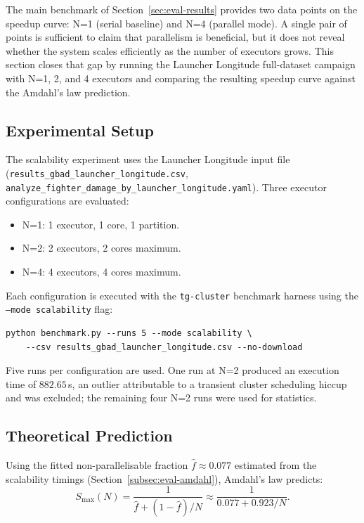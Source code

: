 The main benchmark of Section~\ref{sec:eval-results} provides two data points on
the speedup curve: N=1 (serial baseline) and N=4 (parallel mode).  A single pair of
points is sufficient to claim that parallelism is beneficial, but it does not reveal
whether the system scales efficiently as the number of executors grows.  This section
closes that gap by running the Launcher Longitude full-dataset campaign with N=1, 2, and 4
executors and comparing the resulting speedup curve against the Amdahl's law prediction.

\subsection{Experimental Setup}
\label{subsec:eval-scalability-setup}

The scalability experiment uses the Launcher Longitude input file
(\texttt{results\_gbad\_launcher\_longitude.csv}, \texttt{analyze\_fighter\_damage\_by\_launcher\_longitude.yaml}).
Three executor configurations are evaluated:

\begin{itemize}
    \item N=1: 1 executor, 1 core, 1 partition.
    \item N=2: 2 executors, 2 cores maximum.
    \item N=4: 4 executors, 4 cores maximum.
\end{itemize}

Each configuration is executed with the \texttt{tg-cluster} benchmark harness using
the \texttt{--mode scalability} flag:

\begin{verbatim}
python benchmark.py --runs 5 --mode scalability \
    --csv results_gbad_launcher_longitude.csv --no-download
\end{verbatim}

Five runs per configuration are used.  One run at N=2 produced an execution time of
$882.65$\,s, an outlier attributable to a transient cluster scheduling hiccup  
and was excluded; the remaining four N=2 runs were used for statistics.

\subsection{Theoretical Prediction}
\label{subsec:eval-scalability-theory}

Using the fitted non-parallelisable fraction $\hat{f} \approx 0.077$ estimated from the
scalability timings (Section~\ref{subsec:eval-amdahl}), Amdahl's law predicts:
\[
S_{\max}(N) = \frac{1}{\hat{f} + (1-\hat{f})/N}
\approx \frac{1}{0.077 + 0.923/N}.
\]

